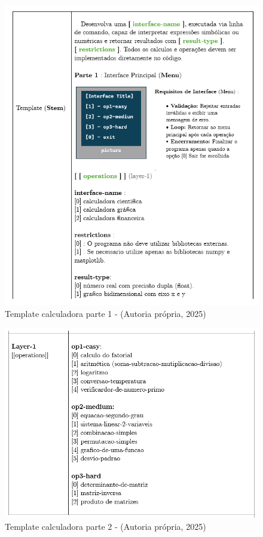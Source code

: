 \begin{figure}
    \centering
    \includegraphics[width=12cm]{./imagens/capitulo4/template-1.png}
    \caption{Template calculadora parte 1 - (Autoria própria, 2025)}
    \label{fig:template-1}
\end{figure}

\begin{figure}
    \centering
    \includegraphics[width=12cm]{./imagens/capitulo4/template-2.png}
    \caption{Template calculadora parte 2 - (Autoria própria, 2025)}
    \label{fig:template-2}
\end{figure}


